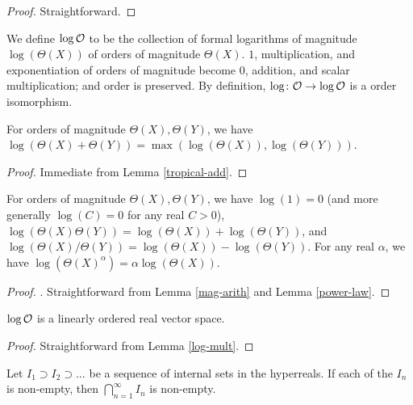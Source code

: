 \begin{proof} Straightforward.
\end{proof}

\begin{definition} \label{log-order-def}\leanok  We define $\log {\mathcal O}$ to be the collection of formal logarithms of magnitude $\log(\Theta(X))$ of orders of magnitude $\Theta(X)$.  $1$, multiplication, and exponentiation of orders of magnitude become $0$, addition, and scalar multiplication; and order is preserved. By definition, $\log \colon {\mathcal O} \to \log {\mathcal O}$ is a order isomorphism.
\end{definition}


\begin{lemma}\label{log-add}  For orders of magnitude $\Theta(X), \Theta(Y)$, we have $\log(\Theta(X) + \Theta(Y)) = \max(\log(\Theta(X)), \log(\Theta(Y)))$.
\end{lemma}

\begin{proof} Immediate from Lemma \ref{tropical-add}.
\end{proof}

\begin{lemma}\label{log-mult}  For orders of magnitude $\Theta(X), \Theta(Y)$, we have $\log(1) = 0$ (and more generally $\log(C) = 0$ for any real $C>0$), $\log(\Theta(X) \Theta(Y)) = \log(\Theta(X)) + \log(\Theta(Y))$, and $\log(\Theta(X) / \Theta(Y)) = \log(\Theta(X)) - \log(\Theta(Y))$.  For any real $\alpha$, we have $\log(\Theta(X)^\alpha) = \alpha \log(\Theta(X))$.
\end{lemma}

\begin{proof}. Straightforward from Lemma \ref{mag-arith} and Lemma \ref{power-law}.
\end{proof}


\begin{lemma}\label{ord-vec} $\log {\mathcal O}$ is a linearly ordered real vector space.
\end{lemma}

\begin{proof} Straightforward from Lemma \ref{log-mult}.
\end{proof}

\begin{lemma}\label{saturation}\leanok Let $I_1 \supset I_2 \supset \dots$ be a sequence of internal sets in the hyperreals.  If each of the $I_n$ is non-empty, then $\bigcap_{n=1}^\infty I_n$ is non-empty.
\end{lemma}

